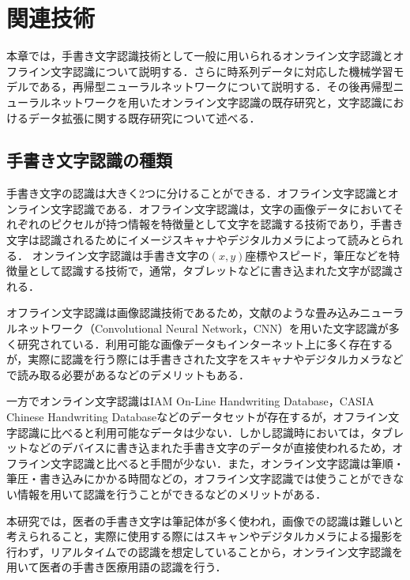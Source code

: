 
\chapter{関連技術}
\label{cha:relate}
本章では，手書き文字認識技術として一般に用いられるオンライン文字認識とオフライン文字認識について説明する．さらに時系列データに対応した機械学習モデルである，再帰型ニューラルネットワークについて説明する．その後再帰型ニューラルネットワークを用いたオンライン文字認識の既存研究と，文字認識におけるデータ拡張に関する既存研究について述べる．

\section{手書き文字認識の種類}
\label{sec:rel_1}
手書き文字の認識は大きく2つに分けることができる．オフライン文字認識とオンライン文字認識である．オフライン文字認識は，文字の画像データにおいてそれぞれのピクセルが持つ情報を特徴量として文字を認識する技術であり，手書き文字は認識されるためにイメージスキャナやデジタルカメラによって読みとられる．
オンライン文字認識は手書き文字の$(x, y)$座標やスピード，筆圧などを特徴量として認識する技術で，通常，タブレットなどに書き込まれた文字が認識される．

オフライン文字認識は画像認識技術であるため，文献\cite{yuan12:offline}のような畳み込みニューラルネットワーク（Convolutional Neural Network，CNN）を用いた文字認識が多く研究されている．利用可能な画像データもインターネット上に多く存在するが，実際に認識を行う際には手書きされた文字をスキャナやデジタルカメラなどで読み取る必要があるなどのデメリットもある．

一方でオンライン文字認識はIAM On-Line Handwriting Database\cite{iam}，CASIA Chinese Handwriting Database\cite{liu11:casia}などのデータセットが存在するが，オフライン文字認識に比べると利用可能なデータは少ない．しかし認識時においては，タブレットなどのデバイスに書き込まれた手書き文字のデータが直接使われるため，オフライン文字認識と比べると手間が少ない．また，オンライン文字認識は筆順・筆圧・書き込みにかかる時間などの，オフライン文字認識では使うことができない情報を用いて認識を行うことができるなどのメリットがある．

本研究では，医者の手書き文字は筆記体が多く使われ，画像での認識は難しいと考えられること，実際に使用する際にはスキャンやデジタルカメラによる撮影を行わず，リアルタイムでの認識を想定していることから，オンライン文字認識を用いて医者の手書き医療用語の認識を行う．

